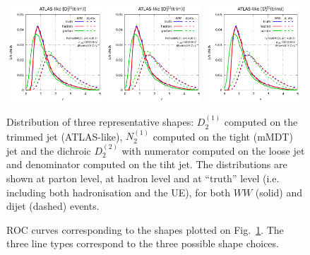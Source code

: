 \documentclass[11pt,letterpaper]{article}
\begin{document}
\begin{figure}
  \includegraphics[width=0.32\textwidth,page=1]{figures/shape-distribs.pdf}
  \hfill
  \includegraphics[width=0.32\textwidth,page=2]{figures/shape-distribs.pdf}
  \hfill
  \includegraphics[width=0.32\textwidth,page=3]{figures/shape-distribs.pdf}
  \caption{Distribution of three representative shapes: $D_2^{(1)}$
    computed on the trimmed jet (ATLAS-like), $N_2^{(1)}$ computed on
    the tight (mMDT) jet and the dichroic $D_2^{(2)}$ with numerator
    computed on the loose jet and denominator computed on the tiht
    jet. The distributions are shown at parton level, at hadron level
    and at ``truth'' level (i.e. including both hadronisation and the
    UE), for both $WW$ (solid) and dijet (dashed)
    events.}\label{fig:shape-distribution}
\end{figure}

\begin{figure}
  \caption{ROC curves corresponding to the shapes plotted on
    Fig.~\ref{fig:shape-distribution}. The three line types correspond
    to the three possible shape choices.}\label{fig:rocs}
\end{figure}
\end{document}

